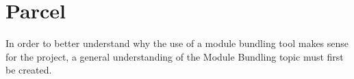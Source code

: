 \section{Parcel}
\label{sec:tecParcel}
%
% 
In order to better understand why the use of a module bundling tool makes sense for the project, a general understanding of the Module Bundling topic must first be created.

